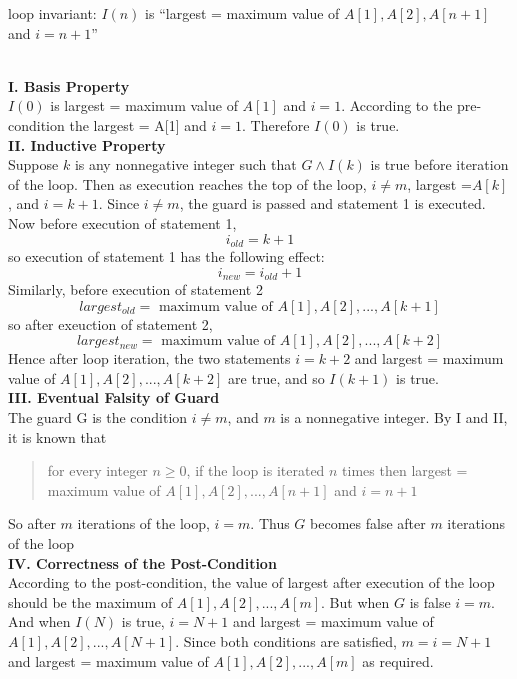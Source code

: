\documentclass[12pt,letterpaper, onecolumn]{exam}
\begin{document}
\begin{questions}
	loop invariant: $I(n)$ is ``largest = maximum value of $A[1], A[2],A[n+1]$ and $i=n+1$”
	\begin{solution}\\
		\textbf{I. Basis Property}\\
		$I(0)$ is largest = maximum value of  $A[1]$ and $i=1$. According to the pre-condition the largest = A[1] and $i=1$. Therefore $I(0)$ is true.\\
		\textbf{II. Inductive Property}\\
		Suppose $k$ is any nonnegative integer such that $G\land I(k)$ is true before iteration of the loop. Then as execution reaches the top of the loop, $i\neq m$, largest =$A[k]$, and $i=k+1$. Since $i\neq m$, the guard is passed and statement 1 is executed. Now before execution of statement 1,
		$$i_{old}=k+1$$
		so execution of statement 1 has the following effect:
		$$i_{new}=i_{old}+1$$
		Similarly, before execution of statement 2
		$$largest_{old}=\textrm{ maximum value of } A[1], A[2],...,A[k+1]$$
		so after exeuction of statement 2,
		$$largest_{new}=\textrm{ maximum value of } A[1], A[2],...,A[k+2]$$
		Hence after loop iteration, the two statements $i=k+2$ and largest = maximum value of  $A[1], A[2],...,A[k+2]$ are true, and so $I(k+1)$ is true.\\
		\textbf{III. Eventual Falsity of Guard}\\
		The guard G is the condition $i\neq m$, and $m$ is a nonnegative integer. By I and II, it is known that
		\begin{quote}
			for every integer $n\geq0$, if the loop is iterated $n$ times then largest = maximum value of $A[1], A[2],...,A[n+1]$ and $i=n+1$ 
		\end{quote}
		So after $m$ iterations of the loop, $i=m$. Thus $G$ becomes false after $m$ iterations of the loop\\
		\textbf{IV. Correctness of the Post-Condition}\\
		According to the post-condition, the value of largest after execution of the loop should be the maximum of $A[1], A[2],...,A[m]$. But when $G$ is false $i=m$. And when $I(N)$ is true, $i=N+1$ and largest = maximum value of $A[1], A[2],...,A[N+1]$. Since both conditions are satisfied, $m=i=N+1$ and largest = maximum value of $A[1], A[2],...,A[m]$ as required.
	\end{solution}
\end{questions}
\end{document}
